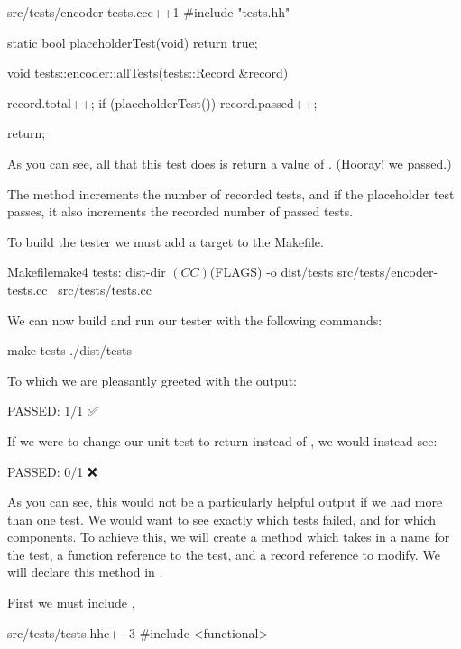 \begin{file}{src/tests/encoder-tests.cc}{c++}{1}
#include "tests.hh"

static bool placeholderTest(void)
{
	return true;
}

void tests::encoder::allTests(tests::Record &record)
{
	record.total++;
	if (placeholderTest()) {
		record.passed++;
	}

	return;
}
\end{file}

As you can see, all that this test does is return a value of . (Hooray! we passed.)

The  method increments the number of recorded tests, and if the placeholder test passes, it also increments the recorded number of passed tests.

To build the tester we must add a target to the Makefile.

\begin{file}{Makefile}{make}{4}
tests: dist-dir
	$(CC) $(FLAGS) -o dist/tests src/tests/encoder-tests.cc \
	                             src/tests/tests.cc
\end{file}

We can now build and run our tester with the following commands:

\begin{stdout}
make tests
./dist/tests
\end{stdout}

To which we are pleasantly greeted with the output:

\begin{stdout}
PASSED: 1/1 ✅
\end{stdout}

If we were to change our unit test to return  instead of , we would instead see:

\begin{stdout}
PASSED: 0/1 ❌
\end{stdout}

As you can see, this would not be a particularly helpful output if we had more than one test. We would want to see exactly which tests failed, and for which components. To achieve this, we will create a method  which takes in a name for the test, a function reference to the test, and a record reference to modify. We will declare this method in .

First we must include ,

\begin{file}{src/tests/tests.hh}{c++}{3}
#include <functional>
\end{file}

